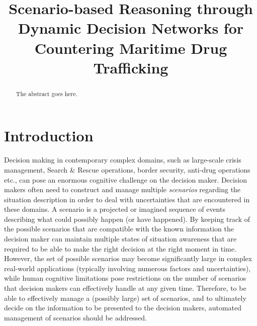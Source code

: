 \documentclass[conference]{IEEEtran}
\begin{document}
\title{Scenario-based Reasoning through Dynamic Decision Networks for Countering Maritime Drug Trafficking}

\author{  
\and
{}
\and
{}
}


\maketitle

\begin{abstract}
The abstract goes here.
\end{abstract}

\IEEEpeerreviewmaketitle

\section{Introduction}

Decision making in contemporary complex domains, such as large-scale crisis management, Search \& Rescue operations, border security, anti-drug operations etc., can pose an enormous cognitive challenge on the decision maker. Decision makers often need to construct and manage multiple {\em scenarios} regarding the situation description in order to deal with uncertainties that are encountered in these domains. A scenario is a projected or imagined sequence of events describing what could possibly happen (or have happened). By keeping track of the possible scenarios that are compatible with the known information the decision maker can maintain multiple states of situation awareness that are required to be able to make the right decision at the right moment in time. However, the set of possible scenarios may become significantly large in complex real-world applications (typically involving numerous factors and uncertainties), while human cognitive limitations pose restrictions on the number of scenarios that decision makers can effectively handle at any given time. Therefore, to be able to effectively manage a (possibly large) set of scenarios, and to ultimately decide on the information to be presented to the decision makers, automated management of scenarios should be addressed.
\end{document}
